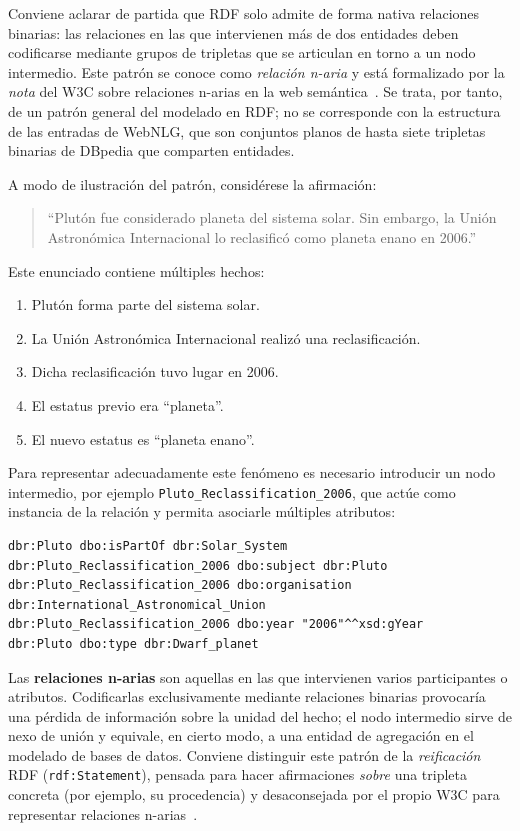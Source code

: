 Conviene aclarar de partida que RDF solo admite de forma nativa relaciones
binarias: las relaciones en las que intervienen más de dos entidades deben
codificarse mediante grupos de tripletas que se articulan en torno a un nodo
intermedio. Este patrón se conoce como \textit{relación n-aria} y está
formalizado por la \textit{nota} del W3C sobre relaciones n-arias en la web
semántica~\cite{NoyRector2006}. Se trata, por tanto, de un patrón general del
modelado en RDF; no se corresponde con la estructura de las entradas de WebNLG,
que son conjuntos planos de hasta siete tripletas binarias de DBpedia que
comparten entidades.

A modo de ilustración del patrón, considérese la afirmación:

\begin{quote}
	``Plutón fue considerado planeta del sistema solar. Sin embargo, la Unión Astronómica Internacional lo reclasificó como planeta enano en 2006.''
\end{quote}

Este enunciado contiene múltiples hechos:

\begin{enumerate}
	\item Plutón forma parte del sistema solar.
	\item La Unión Astronómica Internacional realizó una reclasificación.
	\item Dicha reclasificación tuvo lugar en 2006.
	\item El estatus previo era ``planeta''.
	\item El nuevo estatus es ``planeta enano''.
\end{enumerate}

Para representar adecuadamente este fenómeno es necesario introducir un nodo
intermedio, por ejemplo \texttt{Pluto\_Reclassification\_2006}, que actúe como
instancia de la relación y permita asociarle múltiples atributos:

\begin{verbatim}
dbr:Pluto dbo:isPartOf dbr:Solar_System
dbr:Pluto_Reclassification_2006 dbo:subject dbr:Pluto
dbr:Pluto_Reclassification_2006 dbo:organisation dbr:International_Astronomical_Union
dbr:Pluto_Reclassification_2006 dbo:year "2006"^^xsd:gYear
dbr:Pluto dbo:type dbr:Dwarf_planet
\end{verbatim}

Las \textbf{relaciones n-arias} son aquellas en las que intervienen varios
participantes o atributos. Codificarlas exclusivamente mediante relaciones
binarias provocaría una pérdida de información sobre la unidad del hecho; el
nodo intermedio sirve de nexo de unión y equivale, en cierto modo, a una
entidad de agregación en el modelado de bases de datos. Conviene distinguir
este patrón de la \textit{reificación} RDF (\texttt{rdf:Statement}), pensada
para hacer afirmaciones \emph{sobre} una tripleta concreta (por ejemplo, su
procedencia) y desaconsejada por el propio W3C para representar relaciones
n-arias~\cite{NoyRector2006}.

